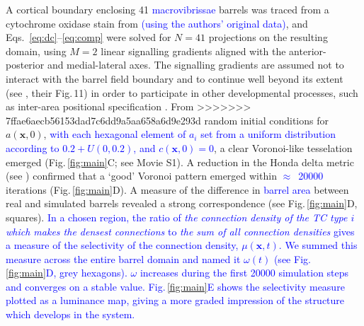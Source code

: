 \documentclass[9pt,lineno,draft]{elife}
\newcommand{\cmnt}[1]{\textcolor{blue}{#1}}
\newcommand{\mpfour}[1]{\textcolor{revgreen}{#1}}
\newcommand{\mb}[1]{\mathbf{#1}}
\begin{document}
A cortical boundary enclosing 41 \cmnt{macrovibrissae} barrels was traced from
a cytochrome oxidase stain from \cite{zheng_signal_2001} \cmnt{(using the
  authors' original data)}, and Eqs.~\ref{eq:dc}--\ref{eq:comp} were solved
for $N=41$ projections on the resulting domain, using $M=2$ linear signalling
gradients aligned with the anterior-posterior and medial-lateral axes.
%
\mpfour{The signalling gradients are assumed not to interact with the barrel
  field boundary and to continue well beyond its extent (see
  \citealp{miller_epha7-ephrin-a5_2006}, their Fig.\,11) in order to
  participate in other developmental processes, such as inter-area positional
  specification \citep{sur_patterning_2005,oleary_area_2007}.} %
%
From
>>>>>>> 7ffae6aecb56153dad7c6dd9a5aa658a6d9e293d
random initial conditions for $a(\mb{x},0)$, \cmnt{with each hexagonal element
  of $a_i$ set from a uniform distribution according to $0.2+{U}(0,0.2)$, and
  $c(\mb{x},0)=0$}, a clear Voronoi-like tesselation
emerged (Fig.\,\ref{fig:main}C; see Movie S1). A reduction in the Honda delta
metric (see \citealp{senft_mouse_1991}) confirmed that a `good' Voronoi
pattern emerged within \cmnt{$\approx$~20000} iterations
(Fig.\,\ref{fig:main}D).  A measure of the difference in \cmnt{barrel area}
between real and simulated barrels revealed a strong correspondence (see
Fig.\,\ref{fig:main}D, squares). \cmnt{In a chosen region, the ratio of
  \emph{the connection density of the TC type $i$ which makes the densest
    connections} to \emph{the sum of all connection densities} gives a measure
  of the selectivity of the connection density, $\mu(\mb{x},t)$. We summed this measure
  across the entire barrel domain and named it $\omega(t)$ (see
  Fig.\,\ref{fig:main}D, grey hexagons). $\omega$ increases during the first
  20000 simulation steps and converges on a stable
  value. Fig.\,\ref{fig:main}E shows the selectivity measure plotted as a
  luminance map, giving a more graded impression of the structure which
  develops in the system.}
\end{document}
